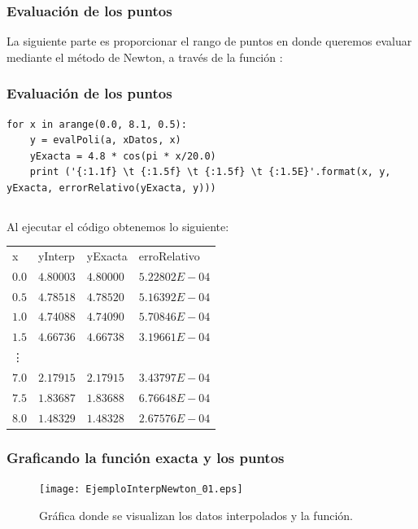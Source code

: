 \begin{frame}[fragile]
\frametitle{Evaluación de los puntos}
La siguiente parte es proporcionar el rango de puntos en donde queremos evaluar mediante el método de Newton, a través de la función :
\end{frame}
\begin{frame}[fragile]
\frametitle{Evaluación de los puntos}
\begin{lstlisting}[caption=Evaluando los puntos y el error relativo, style=FormattedNumber, basicstyle=\linespread{1.1}\ttfamily=\small, columns=fullflexible]
for x in arange(0.0, 8.1, 0.5):
    y = evalPoli(a, xDatos, x)
    yExacta = 4.8 * cos(pi * x/20.0)
    print ('{:1.1f} \t {:1.5f} \t {:1.5f} \t {:1.5E}'.format(x, y, yExacta, errorRelativo(yExacta, y)))
\end{lstlisting}
\begin{lstlisting}
\end{lstlisting}
\end{frame}
\begin{frame}
Al ejecutar el código obtenemos lo siguiente:
\fontsize{12}{12}\selectfont
\begin{center}
\begin{tabular}{l l l l}
x & yInterp & yExacta & erroRelativo\\
$0.0$ & $4.80003$ & $4.80000$ & $5.22802E-04$ \\
$0.5$ & $4.78518$ & $4.78520$ & $5.16392E-04$ \\
$1.0$ & $4.74088$ & $4.74090$ & $5.70846E-04$ \\
$1.5$ & $4.66736$ & $4.66738$ & $3.19661E-04$ \\
\vdots \\
$7.0$ & $2.17915$ & $2.17915$ & $3.43797E-04$ \\
$7.5$ & $1.83687$ & $1.83688$ & $6.76648E-04$ \\
$8.0$ & $1.48329$ & $1.48328$ & $2.67576E-04$
\end{tabular}
\end{center}
\end{frame}
\begin{frame}
\frametitle{Graficando la función exacta y los puntos}
\begin{figure}
	\centering
	\texttt{[image: EjemploInterpNewton\_01.eps]}
	\caption{Gráfica donde se visualizan los datos interpolados y la función.}
\end{figure}
\end{frame}
